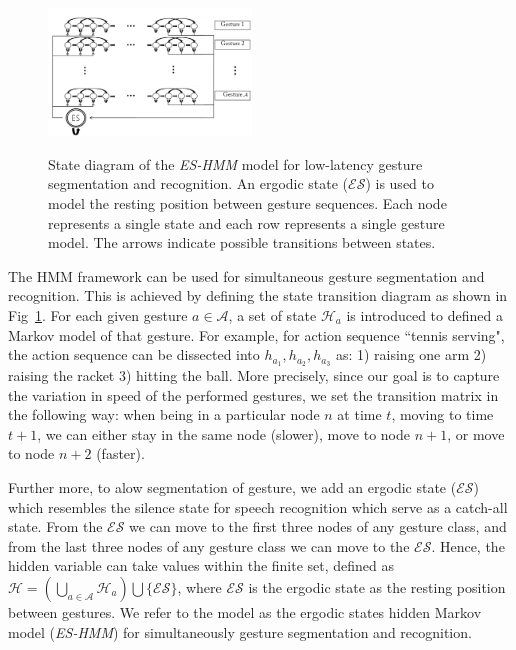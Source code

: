 \begin{figure}[t]
  \centering
  \includegraphics[width=0.48\textwidth]{images/HMM_2_new}\\
  \caption{
    State diagram of the \emph{ES-HMM} model for low-latency gesture segmentation and recognition. An ergodic state (\emph{$\mathcal{ES}$}) is used to model the resting position between gesture sequences. Each node represents a single state and each row represents a single gesture model. The arrows indicate possible transitions between states.}
    \label{HMM_ES}
\end{figure}
The HMM framework can be used for simultaneous gesture segmentation and recognition.
This is achieved by defining the state transition diagram as shown in Fig~\ref{HMM_ES}. For each given gesture $a \in \mathcal{A}$, a set of state $\mathcal{H}_a$ is introduced to defined a Markov model of that gesture. For example, for action sequence ``tennis serving", the action sequence can be dissected into $h_{a_1}, h_{a_2}, h_{a_3}$ as: 1) raising one arm 2) raising the racket 3) hitting the ball.
More precisely, since our goal is to capture the variation in speed of the performed gestures, we set the transition matrix \transitionmatrix{}  in the following way: when being in a particular node $n$ at time $t$, moving to time $t + 1$, we can either stay in the same node (slower), move to node $n + 1$, or move to node $n+2$ (faster).

Further more, to alow segmentation of gesture, we add an ergodic state (\emph{$\mathcal{ES}$}) which resembles the silence state for speech recognition which serve as a catch-all state.
From the $\mathcal{ES}$ we can move to the first three nodes of any gesture class, and from the last three nodes of any gesture class we can move to the $\mathcal{ES}$.
Hence, the hidden variable \hiddenvariable{} can take values within the finite set, defined as $\mathcal{H}=(\bigcup _{a \in \mathcal{A}} \mathcal{H}_a) \bigcup \{\mathcal{ES}\}$, where $\mathcal{ES}$ is the ergodic state as the resting position between gestures. We refer to the model as the ergodic states hidden Markov model (\emph{ES-HMM}) for simultaneously gesture segmentation and recognition.


